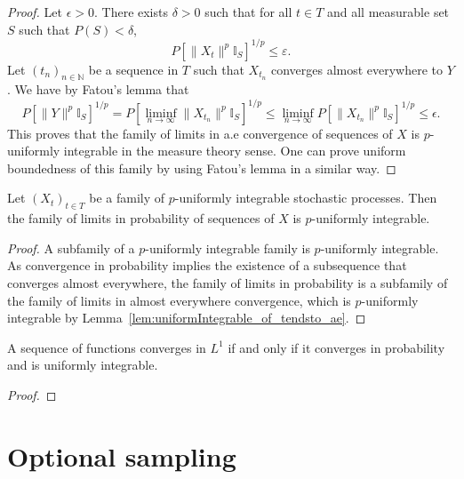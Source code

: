 \begin{proof}
  \mathlibok
  Let $\epsilon > 0$. There exists $\delta > 0$ such that for all $t\in T$ and all measurable set $S$ such that $P(S)<\delta$,
  \[P[\|X_t\|^p\mathbb{I}_S]^{1/p}\le \varepsilon.\]
  Let $(t_n)_{n \in \mathbb{N}}$ be a sequence in $T$ such that $X_{t_n}$ converges almost everywhere to $Y$. We have by Fatou's lemma that
  \[P[\|Y\|^p \mathbb{I}_{S}]^{1/p} = P[\liminf_{n \to \infty} \|X_{t_{n}}\|^p \mathbb{I}_{S}]^{1/p} \le \liminf_{n \to \infty} P[\|X_{t_{n}}\|^p \mathbb{I}_{S}]^{1/p} \le \epsilon.\]
  This proves that the family of limits in a.e convergence of sequences of $X$ is $p$-uniformly integrable in the measure theory sense. One can prove uniform boundedness of this family by using Fatou's lemma in a similar way.
\end{proof}

\begin{lemma}\label{lem:uniformIntegrable_of_tendstoInMeasure}
  \mathlibok
  Let $(X_t)_{t \in T}$ be a family of $p$-uniformly integrable stochastic processes. Then the family of limits in probability of sequences of $X$ is $p$-uniformly integrable.
\end{lemma}

\begin{proof}
  \mathlibok
  A subfamily of a $p$-uniformly integrable family is $p$-uniformly integrable. As convergence in probability implies the existence of a subsequence that converges almost everywhere, the family of limits in probability is a subfamily of the family of limits in almost everywhere convergence, which is $p$-uniformly integrable by Lemma~\ref{lem:uniformIntegrable_of_tendsto_ae}.
\end{proof}

\begin{lemma}\label{lem:vitali}
  \mathlibok
  A sequence of functions converges in $L^1$ if and only if it converges in probability and is uniformly integrable.
\end{lemma}

\begin{proof}\leanok

\end{proof}

\section{Optional sampling}

